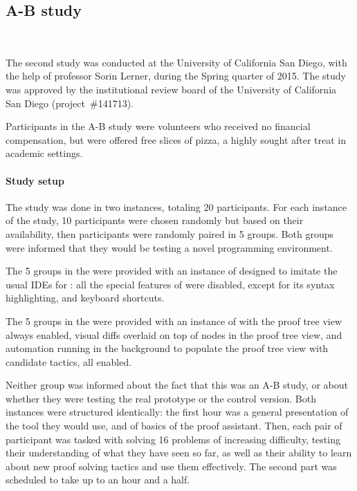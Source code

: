 
\subsection{A-B study}~\label{peacoq-a-b-study}

The second study was conducted at the University of California San Diego, with
the help of professor Sorin Lerner, during the Spring quarter of 2015.  The
study was approved by the institutional review board of the University of
California San Diego (project~\#141713).

Participants in the A-B study were volunteers who received no financial
compensation, but were offered free slices of pizza, a highly sought after treat
in academic settings.

\paragraph{Study setup}

The study was done in two instances, totaling 20 participants.  For each
instance of the study, 10 participants were chosen randomly but based on their
availability, then participants were randomly paired in 5 groups.  Both groups
were informed that they would be testing a novel programming environment.

The 5 groups in the  were provided with an instance of
\PeaCoq{} designed to imitate the usual IDEs for \Coq{}: all the special
features of \PeaCoq{} were disabled, except for its syntax highlighting, and
keyboard shortcuts.

The 5 groups in the  were provided with an instance of
\PeaCoq{} with the proof tree view always enabled, visual diffs overlaid on top
of nodes in the proof tree view, and automation running in the background to
populate the proof tree view with candidate tactics, all enabled.

Neither group was informed about the fact that this was an A-B study, or about
whether they were testing the real prototype or the control version.  Both
instances were structured identically: the first hour was a general presentation
of the tool they would use, and of basics of the \Coq{} proof assistant.  Then,
each pair of participant was tasked with solving 16 problems of increasing
difficulty, testing their understanding of what they have seen so far, as well
as their ability to learn about new proof solving tactics and use them
effectively.  The second part was scheduled to take up to an hour and a half.

